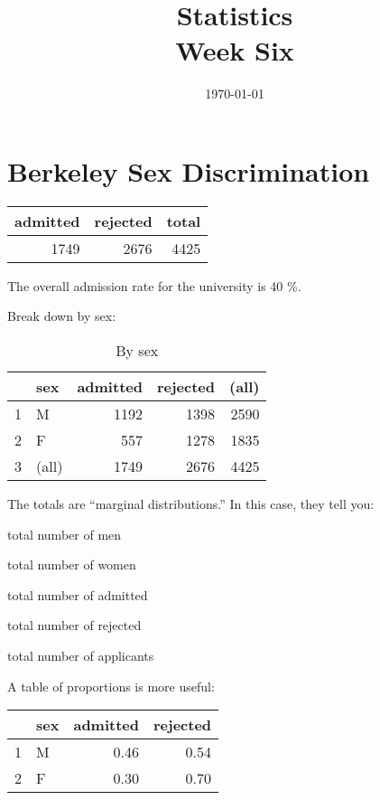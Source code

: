 \documentclass[landscape]{exam}
\title{Statistics \\ Week Six}
\date{\today}
\author{}
\begin{document}
  \maketitle
  \tableofcontents

  \section{Berkeley Sex Discrimination}

  \begin{table}[H]
    \centering
    \begin{tabular}{rrr}
      \toprule
      admitted & rejected & total \\
      \midrule
      1749     & 2676     & 4425 \\
      \bottomrule
    \end{tabular}
  \end{table}

  The overall admission rate for the university is 40 \%.

  Break down by sex:
  \begin{table}[H]
    \centering
    \begin{tabular}{rlrrr}
      \toprule
                & sex   & admitted & rejected & (all) \\
      \midrule
      1         & M     & 1192     & 1398     & 2590 \\
      2         & F     & 557      & 1278     & 1835 \\
      3         & (all) & 1749     & 2676     & 4425 \\
       \bottomrule
    \end{tabular}
    \caption{By sex}
  \end{table}

  The totals are ``marginal distributions.'' In this case, they tell you:
  \begin{itemize*}
    \item total number of men
    \item total number of women
    \item total number of admitted
    \item total number of rejected
    \item total number of applicants
  \end{itemize*}

  A table of proportions is more useful:
  \begin{table}[H]
    \centering
    \begin{tabular}{rlrr}
      \toprule
                & sex & admitted & rejected \\
      \midrule
      1         & M   & 0.46     & 0.54 \\
      2         & F   & 0.30     & 0.70 \\
       \bottomrule
    \end{tabular}
  \end{table}
\end{document}
